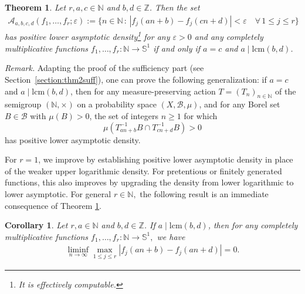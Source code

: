 \documentclass[12pt, reqno, a4paper]{amsart}
\newtheorem{theorem}{Theorem}[section]
\newtheorem{corollary}{Corollary}[section]
\theoremstyle{definition}
\theoremstyle{remark}
\numberwithin{equation}{section}
\renewcommand{\leq}{\leqslant}
\renewcommand{\geq}{\geqslant}
\renewcommand{\epsilon}{\varepsilon}
\begin{document}

\begin{theorem}
\label{thm:diophantine}
Let \( r, a, c  \in \mathbb{N} \) and \( b, d \in \mathbb{Z} \). Then the set
\begin{align*}
\mathcal{A}_{a,b,c,d}(f_1,\ldots,f_r;\epsilon):=\{ n \in \mathbb{N} \,:\, |f_j(an+b)-f_j(cn+d)| < \epsilon \quad \forall \, 1 \leq j \leq r\}
\end{align*}
has positive lower asymptotic density\footnote{It is effectively computable.} for any $\epsilon>0$ and any completely multiplicative functions \( f_1, \ldots, f_r : \mathbb{N} \to \mathbb{S}^1 \)
if and only if \( a = c \) and \( a \mid \mathrm{lcm}(b, d) \).
\end{theorem}
\noindent
\textit{Remark.} Adapting the proof of the sufficiency part (see Section~\ref{section:thm2suff}), one can prove the following generalization: if \( a = c \) and \( a \mid \mathrm{lcm}(b, d) \), then for any measure-preserving action \( T = (T_n)_{n \in \mathbb{N}} \) of the semigroup \( (\mathbb{N}, \times) \) on a probability space \( (X, \mathcal{B}, \mu) \), and for any Borel set \( B \in \mathcal{B} \) with \( \mu(B) > 0 \), the set of integers \( n \geq 1 \) for which
\[
\mu(T_{an+b}^{-1}B \cap T_{cn+d}^{-1}B) > 0
\]
has positive lower asymptotic density.

For $r=1$, we improve \cite[Theorem 1.1]{charamaras2024multiplicativerecurrencelinearpatterns} by establishing positive lower asymptotic density in place of the weaker upper logarithmic density. For pretentious or finitely generated functions, this also improves \cite[Proposition 5.1]{charamaras2024multiplicativerecurrencelinearpatterns} by upgrading the density from lower logarithmic to lower asymptotic. 
For general $r \in \mathbb{N},$ the following result is an immediate consequence of Theorem \ref{thm:diophantine}.

\begin{corollary}
Let \( r, a  \in \mathbb{N} \) and \( b, d \in \mathbb{Z} \). If \( a \mid \mathrm{lcm}(b, d) \), then for any completely multiplicative functions $f_1, \ldots, f_r:\mathbb{N} \to \mathbb{S}^1,$ we have
\begin{align*}
\liminf_{n \to \infty} \max_{1 \leq j \leq r} |f_j(an+b)-f_j(an+d)| = 0.
\end{align*}
\end{corollary}
\end{document}
